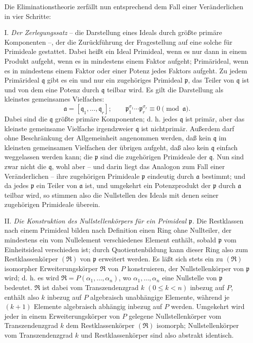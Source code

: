 \documentclass[11pt]{article}
\begin{document}
Die Eliminationstheorie zerfällt nun entsprechend dem Fall einer Veränderlichen in vier Schritte:

I. \emph{Der Zerlegungssatz} -- die Darstellung eines Ideals durch größte primäre Komponenten --, der die Zurückführung der Fragestellung auf eine solche für Primideale gestattet. Dabei heißt ein Ideal Primideal, wenn es nur dann in einem Produkt aufgeht, wenn es in mindestens einem Faktor aufgeht; Primärideal, wenn es in mindestens einem Faktor oder einer Potenz jedes Faktors aufgeht. Zu jedem Primärideal $\mathfrak q$ gibt es ein und nur ein zugehöriges Primideal $\mathfrak p$, das Teiler von $\mathfrak q$ ist und von dem eine Potenz durch $\mathfrak q$ teilbar wird. Es gilt die Darstellung als kleinstes gemeinsames Vielfaches:
\[
 \mathfrak a=[\mathfrak q_1,\ldots,\mathfrak q_r];\qquad
 \mathfrak p_1^{\sigma_1}\cdots \mathfrak p_r^{\sigma_r}\equiv 0\pmod{\mathfrak a}.
\]
Dabei sind die $\mathfrak q$ größte primäre Komponenten; d. h. jedes $\mathfrak q$ ist primär, aber das kleinste gemeinsame Vielfache irgendzweier $\mathfrak q$ ist nichtprimär. Außerdem darf ohne Beschränkung der Allgemeinheit angenommen werden, daß kein $\mathfrak q$ im kleinsten gemeinsamen Vielfachen der übrigen aufgeht, daß also kein $\mathfrak q$ einfach weggelassen werden kann; die $\mathfrak p$ sind die zugehörigen Primideale der $\mathfrak q$. Nun sind zwar nicht die $\mathfrak q$, wohl aber -- und darin liegt das Analogon zum Fall einer Veränderlichen -- ihre zugehörigen Primideale $\mathfrak p$ eindeutig durch $\mathfrak a$ bestimmt; und da jedes $\mathfrak p$ ein Teiler von $\mathfrak a$ ist, und umgekehrt ein Potenzprodukt der $\mathfrak p$ durch $\mathfrak a$ teilbar wird, so stimmen also die Nullstellen des Ideals mit denen seiner zugehörigen Primideale überein.

II. \emph{Die Konstruktion des Nullstellenkörpers für ein Primideal $\mathfrak p$.} Die Restklassen nach einem Primideal bilden nach Definition einen Ring ohne Nullteiler, der mindestens ein vom Nullelement verschiedenes Element enthält, sobald $\mathfrak p$ vom Einheitsideal verschieden ist; durch Quotientenbildung kann dieser Ring also zum Restklassenkörper $(\mathfrak R)$ von $\mathfrak p$ erweitert werden. Es läßt sich stets ein zu $(\mathfrak R)$ isomorpher Erweiterungskörper $\mathfrak R$ von $P$ konstruieren, der Nullstellenkörper von $\mathfrak p$ wird; d. h. es wird $\mathfrak R=P(\alpha_1,\ldots,\alpha_n)$, wo $\alpha_1,\ldots,\alpha_n$ eine Nullstelle von $\mathfrak p$ bedeutet. $\mathfrak R$ ist dabei vom Transzendenzgrad $k$ $(0\leq k<n)$ inbezug auf $P$, enthält also $k$ inbezug auf $P$ algebraisch unabhängige Elemente, während je $(k+1)$ Elemente algebraisch abhängig inbezug auf $P$ werden. Umgekehrt wird jeder in einem Erweiterungskörper von $P$ gelegene Nullstellenkörper vom Transzendenzgrad $k$ dem Restklassenkörper $(\mathfrak R)$ isomorph; Nullstellenkörper vom Transzendenzgrad $k$ und Restklassenkörper sind also abstrakt identisch.
\end{document}

